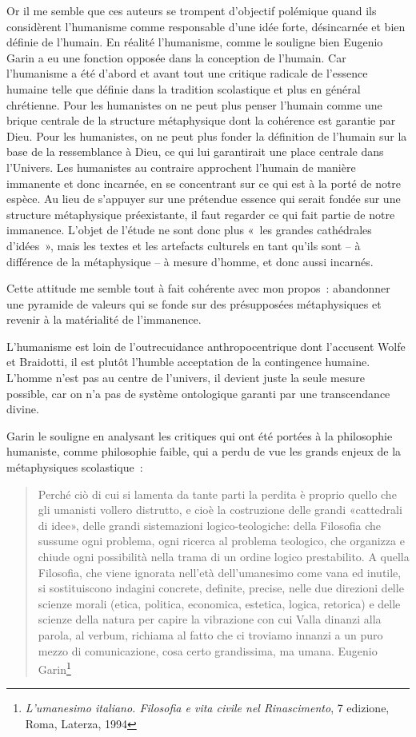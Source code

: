 Or il me semble que ces auteurs se trompent d'objectif polémique quand
ils considèrent l'humanisme comme responsable d'une idée forte,
désincarnée et bien définie de l'humain. En réalité l'humanisme, comme
le souligne bien Eugenio Garin a eu une fonction opposée dans la
conception de l'humain. Car l'humanisme a été d'abord et avant tout une
critique radicale de l'essence humaine telle que définie dans la
tradition scolastique et plus en général chrétienne. Pour les humanistes
on ne peut plus penser l'humain comme une brique centrale de la
structure métaphysique dont la cohérence est garantie par Dieu. Pour les
humanistes, on ne peut plus fonder la définition de l'humain sur la base
de la ressemblance à Dieu, ce qui lui garantirait une place centrale
dans l'Univers. Les humanistes au contraire approchent l'humain de
manière immanente et donc incarnée, en se concentrant sur ce qui est à
la porté de notre espèce. Au lieu de s'appuyer sur une prétendue essence
qui serait fondée sur une structure métaphysique préexistante, il faut
regarder ce qui fait partie de notre immanence. L'objet de l'étude ne
sont donc plus «~les grandes cathédrales d'idées~», mais les textes et
les artefacts culturels en tant qu'ils sont -- à différence de la
métaphysique -- à mesure d'homme, et donc aussi incarnés.

Cette attitude me semble tout à fait cohérente avec mon propos~:
abandonner une pyramide de valeurs qui se fonde sur des présupposées
métaphysiques et revenir à la matérialité de l'immanence.

L'humanisme est loin de l'outrecuidance anthropocentrique dont
l'accusent Wolfe et Braidotti, il est plutôt l'humble acceptation de la
contingence humaine. L'homme n'est pas au centre de l'univers, il
devient juste la seule mesure possible, car on n'a pas de système
ontologique garanti par une transcendance divine.

Garin le souligne en analysant les critiques qui ont été portées à la
philosophie humaniste, comme philosophie faible, qui a perdu de vue les
grands enjeux de la métaphysiques scolastique~:

\begin{quote}
Perché ciò di cui si lamenta da tante parti la perdita è proprio quello
che gli umanisti vollero distrutto, e cioè la costruzione delle grandi
«cattedrali di idee», delle grandi sistemazioni logico-teologiche: della
Filosofia che sussume ogni problema, ogni ricerca al problema teologico,
che organizza e chiude ogni possibilità nella trama di un ordine logico
prestabilito. A quella Filosofia, che viene ignorata nell'età
dell'umanesimo come vana ed inutile, si sostituiscono indagini concrete,
definite, precise, nelle due direzioni delle scienze morali (etica,
politica, economica, estetica, logica, retorica) e delle scienze della
natura per capire la vibrazione con cui Valla dinanzi alla parola, al
verbum, richiama al fatto che ci troviamo innanzi a un puro mezzo di
comunicazione, cosa certo grandissima, ma umana. Eugenio
Garin\footnote{\emph{L'umanesimo italiano. {Filosofia} e vita civile nel
  {Rinascimento}}, 7 edizione, Roma, Laterza, 1994}
\end{quote}

